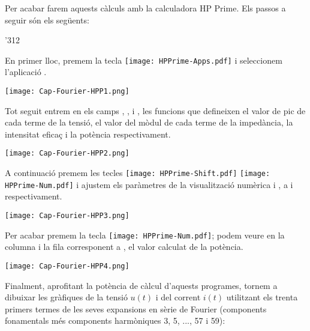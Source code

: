 \begin{exemple}
    \hspace{1cm}

    \hspace{1cm}\newline


    Per acabar farem aquests càlculs amb la calculadora \textsf{HP Prime}.
     Els passos a seguir són els següents:

    \begin{dingautolist}{'312}

        \item En primer lloc, premem la tecla \texttt{[image: HPPrime-Apps.pdf]} i seleccionem l'aplicació .

             \texttt{[image: Cap-Fourier-HPP1.png]}

        \item Tot seguit entrem en els camps , ,  i , les funcions que defineixen el valor de pic de cada terme de la tensió,  el valor del mòdul de cada terme de la impedància,  la intensitat eficaç i la potència respectivament.

            \texttt{[image: Cap-Fourier-HPP2.png]}

        \item  A continuació premem les tecles \texttt{[image: HPPrime-Shift.pdf]} \texttt{[image: HPPrime-Num.pdf]} i ajustem els paràmetres de la visualització numèrica  i , a  i  respectivament.

            \texttt{[image: Cap-Fourier-HPP3.png]}

        \item Per acabar premem la tecla \texttt{[image: HPPrime-Num.pdf]}; podem veure en la columna  i la fila corresponent a , el valor calculat de la potència.

            \texttt{[image: Cap-Fourier-HPP4.png]}

    \end{dingautolist}

    Finalment, aprofitant la potència de càlcul d'aquests programes, tornem a dibuixar les gràfiques de la tensió $u(t)$ i del corrent $i(t)$ utilitzant els trenta primers termes de les seves expansions en sèrie de Fourier (components fonamentals més components harmòniques 3, 5, ..., 57 i 59):
    \vspace{-2mm}
    \begin{center}
      
    \end{center}


\end{exemple}
